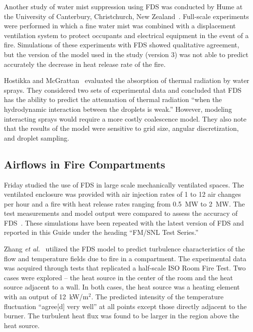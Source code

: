 Another study  of water  mist suppression using  FDS was  conducted by Hume   at   the    University   of   Canterbury,   Christchurch,   New
Zealand~\cite{Hume:Masters}. Full-scale  experiments were performed in which a fine  water mist was combined with  a displacement ventilation system
to protect occupants and electrical equipment in the event of a fire.  Simulations of  these experiments  with FDS  showed qualitative agreement, but
the version of the  model used in the study (version 3) was not able  to predict accurately the decrease  in heat release rate of the fire.

Hostikka    and   McGrattan~\cite{Hostikka:FSJ2006}    evaluated   the absorption of  thermal radiation by water sprays.  They considered two sets of
experimental data and concluded  that FDS has  the ability to predict the  attenuation of thermal radiation  ``when the hydrodynamic interaction
between   the  droplets  is   weak.''  However,  modeling interacting sprays would require a more costly coalescence model. They also note that  the
results of the model were  sensitive to grid size, angular discretization, and droplet sampling.


\subsection{Airflows in Fire Compartments}

Friday studied the  use of FDS in large  scale mechanically ventilated spaces.   The ventilated  enclosure  was provided  with air  injection rates
of  1 to 12 air  changes per hour  and a fire with  heat release rates ranging  from 0.5~MW to  2~MW.  The test measurements  and model output were
compared to assess the accuracy of FDS~\cite{Friday:1}. These simulations have been repeated with the latest version of FDS and reported in this Guide under
the heading ``FM/SNL Test Series.''

Zhang {\em  et al.}~\cite{Zhang:2} utilized  the FDS model  to predict turbulence characteristics  of the flow and temperature  fields due to fire
in a compartment.   The experimental  data was  acquired through tests that replicated a half-scale ISO Room Fire Test.  Two cases were explored --
the heat  source in  the center  of the  room and  the heat source adjacent to a wall.  In both cases, the heat source was a heating element with an output of
12~kW/m$^2$.   The predicted  intensity
of  the temperature  fluctuation  ``agree[d] very well'' at  all points  except those directly  adjacent to  the burner. The turbulent heat flux was
found to be larger in the region above the heat source.


